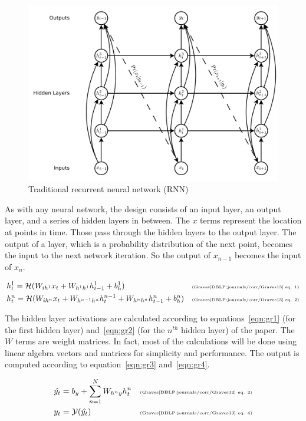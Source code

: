 \documentclass{article}
\begin{document}
    \begin{figure}[hbt!]
        \includegraphics[width=12cm]{graphics/RNN-Arch.png}
        \centering
        \caption{Traditional recurrent neural network (RNN)}
        \label{fig:rnn}
    \end{figure}

As with any neural network, the design consists of an input layer, an output layer, and a series of hidden layers in between. The $x$ terms represent the location at points in time. Those pass through the hidden layers to the output layer. The output of a layer, which is a probability distribution of the next point, becomes the input to the next network iteration. So the output of $x_{n-1}$ becomes the input of $x_{n}$.

    \begin{align}
        \label{eqn:gr1} &h_t^1 = \mathcal{H}(W_{ih^1}x_t + W_{h^1h^1}h_{t-1}^1 + b_h^1) & \text{\tiny{(Graves\cite{DBLP:journals/corr/Graves13} eq. 1)}} \\
        \label{eqn:gr2} &h_t^n = \mathcal{H}(W_{ih^n}x_t + W_{h^{n-1}h^n}h_t^{n-1} + W_{h^nh^n}h_{t-1}^n + b_h^n) & \text{\tiny{(Graves\cite{DBLP:journals/corr/Graves13} eq. 2)}} 
    \end{align}

The hidden layer activations are calculated according to equations~\ref{eqn:gr1} (for the first hidden layer) and~\ref{eqn:gr2} (for the $n^{th}$ hidden layer) of the paper. The $W$ terms are weight matrices. In fact, most of the calculations will be done using linear algebra vectors and matrices for simplicity and performance. The output is computed according to equation~\ref{eqn:gr3} and~\ref{eqn:gr4}.

    \begin{align}
        \label{eqn:gr3} \hat{y_t} &= b_y + \sum_{n=1}^NW_{h^ny}h_t^n & \text{\tiny{(Graves\cite{DBLP:journals/corr/Graves13} eq. 3)}} \\
        \label{eqn:gr4} y_t &= \mathcal{Y}(\hat{y_t}) & \text{\tiny{(Graves\cite{DBLP:journals/corr/Graves13} eq. 4)}}
    \end{align}
    
\end{document}
